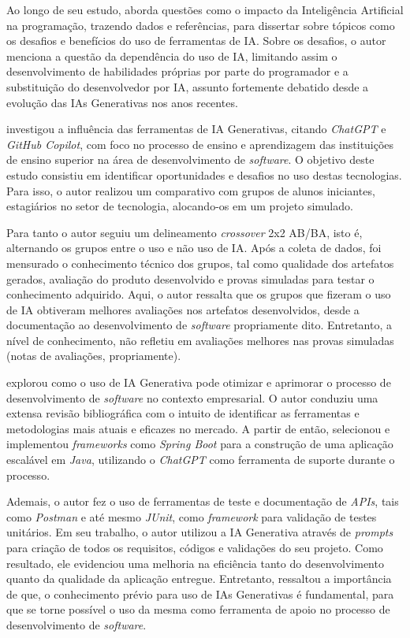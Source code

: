 \documentclass[english,brazilian]{UNISINOSartigo} %
\begin{document}
Ao longo de seu estudo,  aborda questões como o impacto da Inteligência Artificial na programação, trazendo dados e referências, para dissertar sobre tópicos como os desafios e benefícios do uso de ferramentas de IA. Sobre os desafios, o autor menciona a questão da dependência do uso de IA, limitando assim o desenvolvimento de habilidades próprias por parte do programador e a substituição do desenvolvedor por IA, assunto fortemente debatido desde a evolução das IAs Generativas nos anos recentes. 

 investigou a influência das ferramentas de IA Generativas, citando \textit{ChatGPT} e \textit{GitHub Copilot}, com foco no processo de ensino e aprendizagem das instituições de ensino superior na área de desenvolvimento de \textit{software}. O objetivo deste estudo consistiu em identificar oportunidades e desafios no uso destas tecnologias. Para isso, o autor realizou um comparativo com grupos de alunos iniciantes, estagiários no setor de tecnologia, alocando-os em um projeto simulado.

Para tanto o autor \cite{santos2024} seguiu um delineamento \textit{crossover} 2x2 AB/BA, isto é, alternando os grupos entre o uso e não uso de IA. Após a coleta de dados, foi mensurado o conhecimento técnico dos grupos, tal como qualidade dos artefatos gerados, avaliação do produto desenvolvido e provas simuladas para testar o conhecimento adquirido. Aqui, o autor ressalta que os grupos que fizeram o uso de IA obtiveram melhores avaliações nos artefatos desenvolvidos, desde a documentação ao desenvolvimento de \textit{software} propriamente dito. Entretanto, a nível de conhecimento, não refletiu em avaliações melhores nas provas simuladas (notas de avaliações, propriamente).

 explorou como o uso de IA Generativa pode otimizar e aprimorar o processo de desenvolvimento de \textit{software} no contexto empresarial. O autor conduziu uma extensa revisão bibliográfica com o intuito de identificar as ferramentas e metodologias mais atuais e eficazes no mercado. A partir de então, selecionou e implementou \textit{frameworks} como \textit{Spring Boot} para a construção de uma aplicação escalável em \textit{Java}, utilizando o \textit{ChatGPT} como ferramenta de suporte durante o processo.

Ademais, o autor \cite{costa2024} fez o uso de ferramentas de teste e documentação de \textit{APIs}, tais como \textit{Postman} e até mesmo \textit{JUnit}, como \textit{framework} para validação de testes unitários. Em seu trabalho, o autor utilizou a IA Generativa através de \textit{prompts} para criação de todos os requisitos, códigos e validações do seu projeto. Como resultado, ele evidenciou uma melhoria na eficiência tanto do desenvolvimento quanto da qualidade da aplicação entregue. Entretanto, ressaltou a importância de que, o conhecimento prévio para uso de IAs Generativas é fundamental, para que se torne possível o uso da mesma como ferramenta de apoio no processo de desenvolvimento de \textit{software}.
\end{document}

